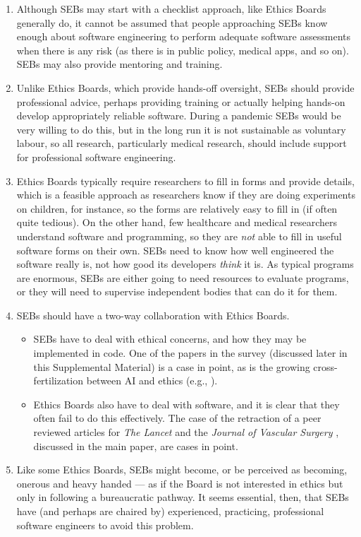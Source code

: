 \documentclass{article}
\def \citeeg#1{(e.g., \cite{#1})}
\def\supplement{Supplemental Material}
\begin{document}
\begin{enumerate}\raggedright
\item 
Although SEBs may start with a checklist approach, like Ethics Boards generally do, it cannot be assumed that people approaching SEBs know enough about software engineering to perform adequate software assessments when there is any risk (as there is in public policy, medical apps, and so on). SEBs may also provide mentoring and training.

\item
Unlike Ethics Boards, which provide hands-off oversight, SEBs should provide professional advice, perhaps providing training or actually helping hands-on develop appropriately reliable software. During a pandemic SEBs would be very willing to do this, but in the long run it is not sustainable as voluntary labour, so all research, particularly medical research, should include support for professional software engineering. 

\item 
Ethics Boards typically require researchers to fill in forms and provide details, which is a feasible approach as researchers know if they are doing experiments on children, for instance, so the forms are relatively easy to fill in (if often quite tedious). On the other hand, few healthcare and medical researchers understand software and programming, so they are \emph{not\/} able to fill in useful software forms on their own. SEBs need to know how well engineered the software really is, not how good its developers \emph{think\/} it is. As typical programs are enormous, SEBs are either going to need resources to evaluate programs, or they will need to supervise independent bodies that can do it for them. 

\item
SEBs should have a two-way collaboration with Ethics Boards. 

\begin{itemize}
\item SEBs have to deal with ethical concerns, and how they may be implemented in code. One of the papers \cite{ethics-paper} in the survey (discussed later in this \supplement) is a case in point, as is the growing cross-fertilization between AI and ethics \citeeg{ai-ethics}.

\item Ethics Boards also have to deal with software, and it is clear that they often fail to do this effectively. The case of the retraction of a peer reviewed articles for \emph{The Lancet\/} \cite{science-lancet1,science-lancet2,lancet-learning} and the \emph{Journal of Vascular Surgery\/} \cite{jvs1,jvs2,jvs3}, discussed in the main paper, are cases in point.
\end{itemize}

\item
Like some Ethics Boards, SEBs might become, or be perceived as becoming, onerous and heavy handed --- as if the Board is not interested in ethics but only in following a bureaucratic pathway. It seems essential, then, that SEBs have (and perhaps are chaired by) experienced, practicing, professional software engineers to avoid this problem. 
\end{enumerate}
\end{document}
